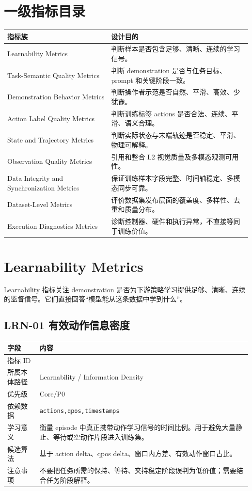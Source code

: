 \documentclass[UTF8,zihao=-4,oneside,openany]{ctexrep}
\newcommand{\Code}[1]{\texttt{#1}}
\newcommand{\MID}[1]{\texttt{\seqsplit{#1}}}
\begin{document}
\section{一级指标目录}

\begin{longtable}{L{5.0cm} L{8.2cm}}
\toprule
指标族 & 设计目的 \\
\midrule
Learnability Metrics & 判断样本是否包含足够、清晰、连续的学习信号。 \\
Task-Semantic Quality Metrics & 判断 demonstration 是否与任务目标、prompt 和关键阶段一致。 \\
Demonstration Behavior Metrics & 判断操作者示范是否自然、平滑、高效、少犹豫。 \\
Action Label Quality Metrics & 判断训练标签 actions 是否合法、连续、平滑、语义合理。 \\
State and Trajectory Metrics & 判断实际状态与末端轨迹是否稳定、平滑、物理可解释。 \\
Observation Quality Metrics & 引用和整合 L2 视觉质量及多模态观测可用性。 \\
Data Integrity and Synchronization Metrics & 保证训练样本字段完整、时间轴稳定、多模态同步可靠。 \\
Dataset-Level Metrics & 评价数据集发布层面的覆盖度、多样性、去重和质量分布。 \\
Execution Diagnostics Metrics & 诊断控制器、硬件和执行异常，不直接等同于训练价值。 \\
\bottomrule
\end{longtable}

\section{Learnability Metrics}

Learnability 指标关注 demonstration 是否为下游策略学习提供足够、清晰、连续的监督信号。它们直接回答“模型能从这条数据中学到什么”。


\subsection{LRN-01 有效动作信息密度}

\begin{longtable}{L{3.6cm} L{9.6cm}}
\toprule
字段 & 内容 \\
\midrule
指标 ID & \MID{LRN-01} \\
所属本体路径 & Learnability / Information Density \\
优先级 & Core/P0 \\
依赖数据 & \Code{actions,qpos,timestamps} \\
学习意义 & 衡量 episode 中真正携带动作学习信号的时间比例。用于避免大量静止、等待或空动作片段进入训练集。 \\
候选算法 & 基于 action delta、qpos delta、窗口内方差、有效动作窗口占比。 \\
注意事项 & 不要把任务所需的保持、等待、夹持稳定阶段误判为低价值；需要结合任务阶段解释。 \\
\bottomrule
\end{longtable}
\end{document}
